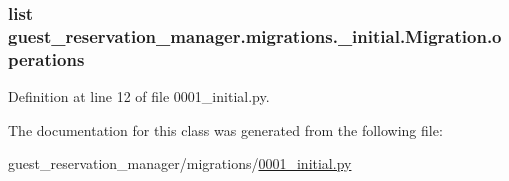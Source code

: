 \hypertarget{classguest__reservation__manager_1_1migrations_1_10001__initial_1_1Migration_a7c69d38a5ee350030b27d2d53c6da642}{
\subsubsection[{operations}]{\setlength{\rightskip}{0pt plus 5cm}list guest\-\_\-reservation\-\_\-manager.\-migrations.\-\_\-initial.\-Migration.\-operations\hspace{0.3cm}{\ttfamily [static]}}}\label{classguest__reservation__manager_1_1migrations_1_10001__initial_1_1Migration_a7c69d38a5ee350030b27d2d53c6da642}


Definition at line 12 of file 0001\-\_\-initial.\-py.



The documentation for this class was generated from the following file\-:\begin{DoxyCompactItemize}
\item 
guest\-\_\-reservation\-\_\-manager/migrations/\hyperlink{guest__reservation__manager_2migrations_20001__initial_8py}{0001\-\_\-initial.\-py}\end{DoxyCompactItemize}
